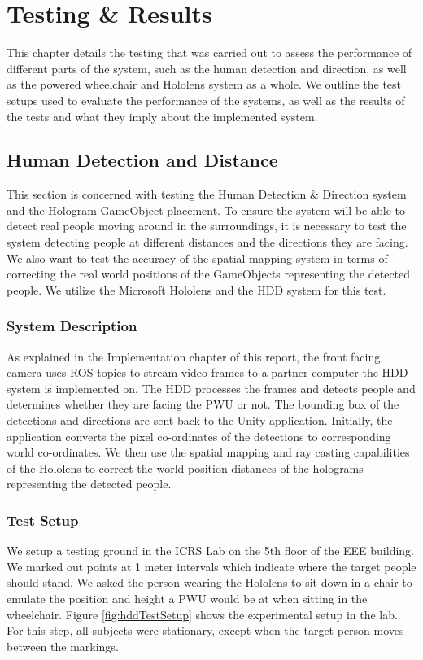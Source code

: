 \chapter{Testing \& Results}
This chapter details the testing that was carried out to assess the performance of different parts of the system, such as the human detection and direction, as well as the powered wheelchair and Hololens system as a whole. We outline the test setups used to evaluate the performance of the systems, as well as the results of the tests and what they imply about the implemented system.

\section{Human Detection and Distance}
This section is concerned with testing the Human Detection \& Direction system and the Hologram GameObject placement. To ensure the system will be able to detect real people moving around in the surroundings, it is necessary to test the system detecting people at different distances and the directions they are facing. We also want to test the accuracy of the spatial mapping system in terms of correcting the real world positions of the GameObjects representing the detected people. We utilize the Microsoft Hololens and the HDD system for this test.

\subsection{System Description} \label{sec:hddSys}
As explained in the Implementation chapter of this report, the front facing camera uses ROS topics to stream video frames to a partner computer the HDD system is implemented on. The HDD processes the frames and detects people and determines whether they are facing the PWU or not. The bounding box of the detections and directions are sent back to the Unity application. Initially, the application converts the pixel co-ordinates of the detections to corresponding world co-ordinates. We then use the spatial mapping and ray casting capabilities of the Hololens to correct the world position distances of the holograms representing the detected people.

\subsection{Test Setup} \label{sec:testSetup}
We setup a testing ground in the ICRS Lab on the 5th floor of the EEE building. We marked out points at 1 meter intervals which indicate where the target people should stand. We asked the person wearing the Hololens to sit down in a chair to emulate the position and height a PWU would be at when sitting in the wheelchair. Figure \ref{fig:hddTestSetup} shows the experimental setup in the lab. For this step, all subjects were stationary, except when the target person moves between the markings.

